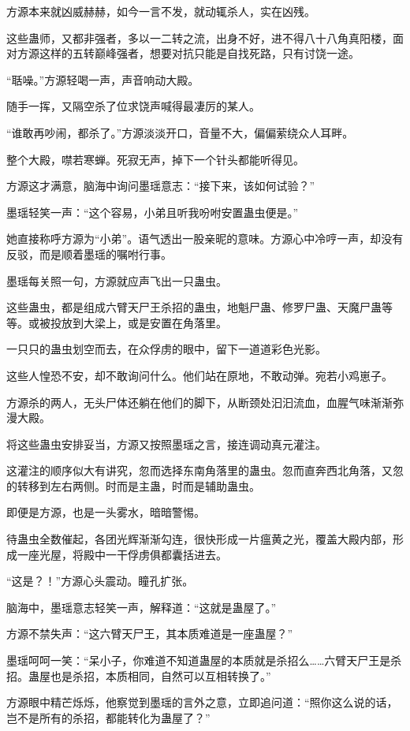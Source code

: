 \begin{this_body}
方源本来就凶威赫赫，如今一言不发，就动辄杀人，实在凶残。

这些蛊师，又都非强者，多以一二转之流，出身不好，进不得八十八角真阳楼，面对方源这样的五转巅峰强者，想要对抗只能是自找死路，只有讨饶一途。

“聒噪。”方源轻喝一声，声音响动大殿。

随手一挥，又隔空杀了位求饶声喊得最凄厉的某人。

“谁敢再吵闹，都杀了。”方源淡淡开口，音量不大，偏偏萦绕众人耳畔。

整个大殿，噤若寒蝉。死寂无声，掉下一个针头都能听得见。

方源这才满意，脑海中询问墨瑶意志：“接下来，该如何试验？”

墨瑶轻笑一声：“这个容易，小弟且听我吩咐安置蛊虫便是。”

她直接称呼方源为“小弟”。语气透出一股亲昵的意味。方源心中冷哼一声，却没有反驳，而是顺着墨瑶的嘱咐行事。

墨瑶每关照一句，方源就应声飞出一只蛊虫。

这些蛊虫，都是组成六臂天尸王杀招的蛊虫，地魁尸蛊、修罗尸蛊、天魔尸蛊等等。或被投放到大梁上，或是安置在角落里。

一只只的蛊虫划空而去，在众俘虏的眼中，留下一道道彩色光影。

这些人惶恐不安，却不敢询问什么。他们站在原地，不敢动弹。宛若小鸡崽子。

方源杀的两人，无头尸体还躺在他们的脚下，从断颈处汩汩流血，血腥气味渐渐弥漫大殿。

将这些蛊虫安排妥当，方源又按照墨瑶之言，接连调动真元灌注。

这灌注的顺序似大有讲究，忽而选择东南角落里的蛊虫。忽而直奔西北角落，又忽的转移到左右两侧。时而是主蛊，时而是辅助蛊虫。

即便是方源，也是一头雾水，暗暗警惕。

待蛊虫全数催起，各团光辉渐渐勾连，很快形成一片瘟黄之光，覆盖大殿内部，形成一座光屋，将殿中一干俘虏俱都囊括进去。

“这是？！”方源心头震动。瞳孔扩张。

脑海中，墨瑶意志轻笑一声，解释道：“这就是蛊屋了。”

方源不禁失声：“这六臂天尸王，其本质难道是一座蛊屋？”

墨瑶呵呵一笑：“呆小子，你难道不知道蛊屋的本质就是杀招么……六臂天尸王是杀招。蛊屋也是杀招，本质相同，自然可以互相转换了。”

方源眼中精芒烁烁，他察觉到墨瑶的言外之意，立即追问道：“照你这么说的话，岂不是所有的杀招，都能转化为蛊屋了？”


\end{this_body}
